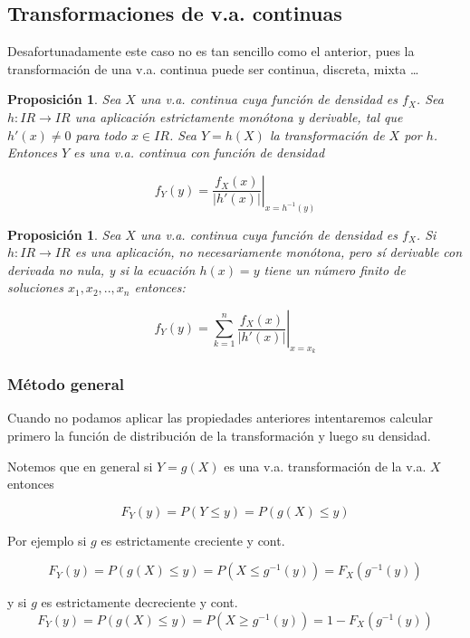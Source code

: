 \documentclass[12pt]{report}
\newtheorem{proposition}[definition]{Proposici\'on}
\def\R{I\!\!R}
\begin{document}
        \subsection{Transformaciones de v.a. continuas}

        Desafortunadamente este caso no es tan sencillo como el anterior, pues la
        transformación de una v.a. continua puede ser continua, discreta, mixta \ldots

        \begin{proposition}
        Sea $X$ una v.a. continua cuya función de densidad es $f_{X}$. Sea
        $h:\R\to\R$ una aplicación estrictamente monótona y derivable, tal
        que $h'(x)\not=0$ para todo $x\in\R$. Sea $Y=h(X)$ la
        transformación de $X$ por $h$. Entonces $Y$ es una v.a. continua con función
        de densidad

       $$f_{Y}(y)=\left.\frac{f_{X}(x)}
        {\left|h'(x)\right|}\right|_{x=h^{-1}(y)}$$
        \end{proposition}

   \begin{proposition}
    Sea $X$ una v.a. continua cuya función de densidad es $f_{X}$. Si
        $h:\R\to\R$ es  una aplicación, no necesariamente monótona,
         pero sí derivable con derivada no nula, y si
        la ecuación $h(x)=y$ tiene un número finito de soluciones
        $x_{1},x_{2},..,x_{n}$ entonces:

        $$\displaystyle f_{Y}(y)=\left.\sum_{k=1}^{n} \frac{f_{X}(x)}
        {\left|h'(x)\right|}\right|_{x=x_{k}}$$
     \end{proposition}

     \subsubsection{Método general}
        Cuando no podamos aplicar las propiedades anteriores intentaremos
        calcular primero la función de distribución de la transformación
        y luego su densidad.

        Notemos que en general si $Y=g(X)$ es una v.a. transformación  de la
        v.a. $X$ entonces

        $$F_{Y}(y)=P(Y\leq y)=P(g(X)\leq y)$$

        Por ejemplo si $g$ es estrictamente creciente y cont.

        $$F_{Y}(y)=P(g(X)\leq y)=P(X\leq g^{-1}(y))=F_{X}(g^{-1}(y))$$

        y si $g$ es estrictamente decreciente y cont.
        $$F_{Y}(y)=P(g(X)\leq y)=P(X\geq g^{-1}(y))=1-F_{X}(g^{-1}(y))$$
\end{document}
